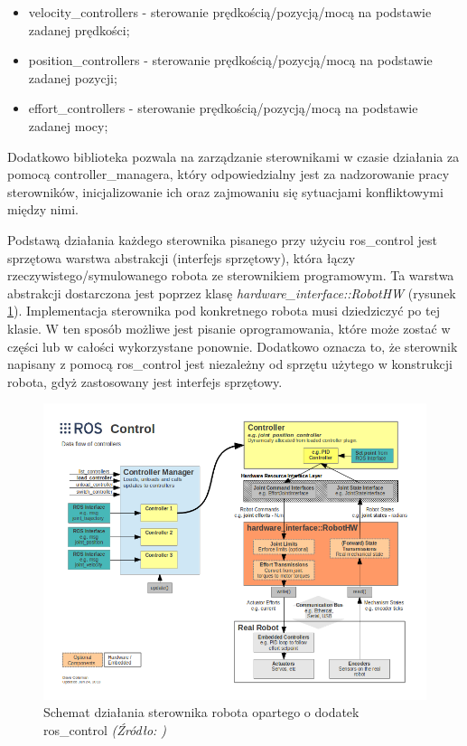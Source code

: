 \documentclass[a4paper, 12pt, twoside]{article}
\begin{document}
\begin{itemize}
\item velocity\_controllers - sterowanie prędkością/pozycją/mocą na podstawie zadanej prędkości;
\item position\_controllers - sterowanie prędkością/pozycją/mocą na podstawie zadanej pozycji;
\item effort\_controllers - sterowanie prędkością/pozycją/mocą na podstawie zadanej mocy;
\end{itemize}

Dodatkowo biblioteka pozwala na zarządzanie sterownikami w czasie działania za pomocą controller\_managera, który odpowiedzialny jest za nadzorowanie pracy sterowników, inicjalizowanie ich oraz zajmowaniu się sytuacjami konfliktowymi między nimi.

Podstawą działania każdego sterownika pisanego przy użyciu ros\_control jest sprzętowa warstwa abstrakcji (interfejs sprzętowy), która łączy rzeczywistego/symulowanego robota ze sterownikiem programowym. Ta warstwa abstrakcji dostarczona jest poprzez klasę \textit{hardware\_interface::RobotHW} (rysunek \ref{fig:ros_control}). Implementacja sterownika pod konkretnego robota musi dziedziczyć po tej klasie. W ten sposób możliwe jest pisanie oprogramowania, które może zostać w części lub w całości wykorzystane ponownie. Dodatkowo oznacza to, że sterownik napisany z pomocą ros\_control jest niezależny od sprzętu użytego w konstrukcji robota, gdyż zastosowany jest interfejs sprzętowy.

\begin{figure}[hbt!]
\centering
\includegraphics[width=0.8\linewidth]{images/gazebo_ros_control.png}
\caption{Schemat działania sterownika robota opartego o dodatek ros\_control \textit{ (Źródło: \cite{roscontrol}) } }
\label{fig:ros_control}
\end{figure}
\end{document}

